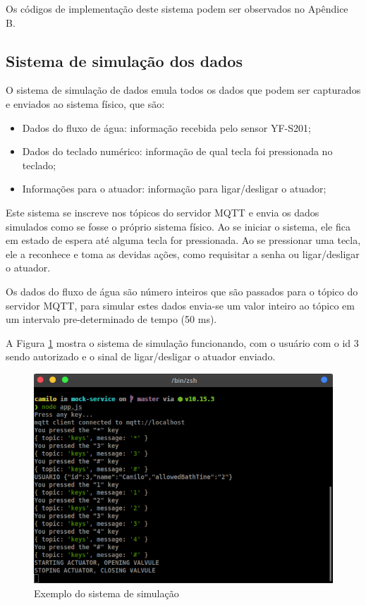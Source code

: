 Os códigos de implementação deste sistema podem ser observados no Apêndice B.

\subsection{Sistema de simulação dos dados}

O sistema de simulação de dados emula todos os dados que podem ser capturados e enviados ao sistema físico, que são:

\begin{itemize}
	\item Dados do fluxo de água: informação recebida pelo sensor YF-S201;
	\item Dados do teclado numérico: informação de qual tecla foi pressionada no teclado;
	\item Informações para o atuador: informação para ligar/desligar o atuador;
\end{itemize}

Este sistema se inscreve nos tópicos do servidor MQTT e envia os dados simulados como se fosse o próprio sistema físico. Ao se iniciar o sistema, ele fica em estado de espera até alguma tecla for pressionada. Ao se pressionar uma tecla, ele a reconhece e toma as devidas ações, como requisitar a senha ou ligar/desligar o atuador.

Os dados do fluxo de água são número inteiros que são passados para o tópico do servidor MQTT, para simular estes dados envia-se um valor inteiro ao tópico em um intervalo pre-determinado de tempo (50 ms).

A Figura \ref{fig:mockservice} mostra o sistema de simulação funcionando, com o usuário com o id 3 sendo autorizado e o sinal de ligar/desligar o atuador enviado.

\begin{figure}[htbp]
	\centering
	\includegraphics[width=0.6\linewidth]{figuras/mockservice.png}
	\caption{Exemplo do sistema de simulação}
	\label{fig:mockservice}
\end{figure}

